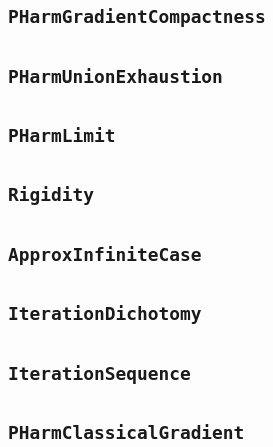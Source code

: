 \documentclass[11pt]{amsart}
\theoremstyle{definition}
\begin{document}
\subsection{\texorpdfstring{\texttt{PHarmGradientCompactness}}{PHarmGradientCompactness}}\label{node:PHarmGradientCompactness}


\subsection{\texorpdfstring{\texttt{PHarmUnionExhaustion}}{PHarmUnionExhaustion}}\label{node:PHarmUnionExhaustion}


\subsection{\texorpdfstring{\texttt{PHarmLimit}}{PHarmLimit}}\label{node:PHarmLimit}


\subsection{\texorpdfstring{\texttt{Rigidity}}{Rigidity}}\label{node:Rigidity}


\subsection{\texorpdfstring{\texttt{ApproxInfiniteCase}}{ApproxInfiniteCase}}\label{node:ApproxInfiniteCase}


\subsection{\texorpdfstring{\texttt{IterationDichotomy}}{IterationDichotomy}}\label{node:IterationDichotomy}


\subsection{\texorpdfstring{\texttt{IterationSequence}}{IterationSequence}}\label{node:IterationSequence}


\subsection{\texorpdfstring{\texttt{PHarmClassicalGradient}}{PHarmClassicalGradient}}\label{node:PHarmClassicalGradient}

\end{document}
